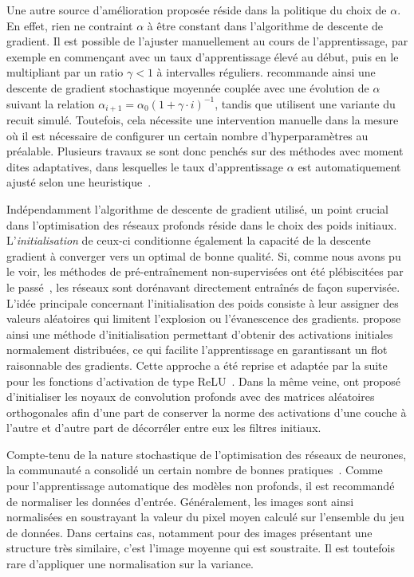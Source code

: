 Une autre source d'amélioration proposée réside dans la politique du choix de $\alpha$. En effet, rien ne contraint $\alpha$ à être constant dans l'algorithme de descente de gradient. Il est possible de l'ajuster manuellement au cours de l'apprentissage, par exemple en commençant avec un taux d'apprentissage élevé au début, puis en le multipliant par un ratio $\gamma < 1$ à intervalles réguliers. \citet{bottou_stochastic_2012} recommande ainsi une descente de gradient stochastique moyennée couplée avec une évolution de $\alpha$ suivant la relation $\alpha_{i+1} = \alpha_0 (1 + \gamma \cdot i)^{-1}$, tandis que \citet{loshchilov_sgdr_2016} utilisent une variante du recuit simulé. Toutefois, cela nécessite une intervention manuelle dans la mesure où il est nécessaire de configurer un certain nombre d'hyperparamètres au préalable. Plusieurs travaux se sont donc penchés sur des méthodes avec moment dites adaptatives, dans lesquelles le taux d'apprentissage $\alpha$ est automatiquement ajusté selon une heuristique~\cite{duchi_adaptive_2011,tielman_lecture_2012,zeiler_adadelta_2012,kingma_adam_2014}.

Indépendamment l'algorithme de descente de gradient utilisé, un point crucial dans l'optimisation des réseaux profonds réside dans le choix des poids initiaux. L'\emph{initialisation} de ceux-ci conditionne également la capacité de la descente gradient à converger vers un optimal de bonne qualité. Si, comme nous avons pu le voir, les méthodes de pré-entraînement non-supervisées ont été plébiscitées par le passé~\cite{hinton_fast_2006,bengio_greedy_2007}, les réseaux sont dorénavant directement entraînés de façon supervisée. L'idée principale concernant l'initialisation des poids consiste à leur assigner des valeurs aléatoires qui limitent l'explosion ou l'évanescence des gradients. \citet{glorot_understanding_2010} propose ainsi une méthode d'initialisation permettant d'obtenir des activations initiales normalement distribuées, ce qui facilite l'apprentissage en garantissant un flot raisonnable des gradients. Cette approche a été reprise et adaptée par la suite pour les fonctions d'activation de type \gls{ReLU}~\cite{he_delving_2015}. Dans la même veine, \citet{saxe_exact_2013} ont proposé d'initialiser les noyaux de convolution profonds avec des matrices aléatoires orthogonales afin d'une part de conserver la norme des activations d'une couche à l'autre et d'autre part de décorréler entre eux les filtres initiaux.

Compte-tenu de la nature stochastique de l'optimisation des réseaux de neurones, la communauté a consolidé un certain nombre de bonnes pratiques~\cite{lecun_efficient_1998,bengio_practical_2012,bottou_stochastic_2012}. Comme pour l'apprentissage automatique des modèles non profonds, il est recommandé de normaliser les données d'entrée. Généralement, les images sont ainsi normalisées en soustrayant la valeur du pixel moyen calculé sur l'ensemble du jeu de données. Dans certains cas, notamment pour des images présentant une structure très similaire, c'est l'image moyenne qui est soustraite. Il est toutefois rare d'appliquer une normalisation sur la variance.

